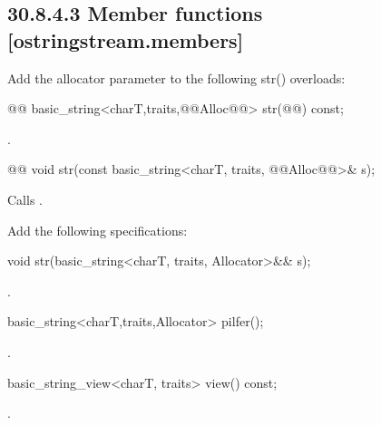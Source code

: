 \documentclass[ebook,11pt,article]{memoir}
\begin{document}
\subsection{30.8.4.3 Member functions [ostringstream.members]}
Add the allocator parameter to the following str() overloads:
\begin{itemdecl}
@@
basic_string<charT,traits,@@Alloc@@> str(@@) const;
\end{itemdecl}
\begin{itemdescr}
\pnum
\returns
{}.
\end{itemdescr}

\begin{itemdecl}
    @@
    void str(const basic_string<charT, traits, @@Alloc@@>& s);
\end{itemdecl}

\begin{itemdescr}
\pnum
\effects
Calls
.
\end{itemdescr}


Add the following specifications:

\begin{addedblock}
\begin{itemdecl}
void str(basic_string<charT, traits, Allocator>&& s);
\end{itemdecl}
\begin{itemdescr}
\pnum
\effects {}.
\end{itemdescr}
\begin{itemdecl}
basic_string<charT,traits,Allocator> pilfer();
\end{itemdecl}
\begin{itemdescr}
\pnum
\returns {}.
\end{itemdescr}
\begin{itemdecl}
basic_string_view<charT, traits> view() const;
\end{itemdecl}
\begin{itemdescr}
\pnum
\returns {}.
\end{itemdescr}
\end{addedblock}


\end{document}
